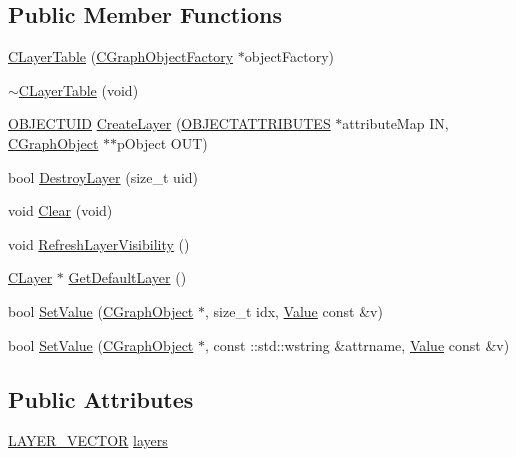 \subsection*{Public Member Functions}
\begin{DoxyCompactItemize}
\item 
\hyperlink{class_n_m_1_1_o_d_b_1_1_c_layer_table_a3bd3aa3cfc0edd9188c6542484140a89}{C\+Layer\+Table} (\hyperlink{class_n_m_1_1_o_d_b_1_1_c_graph_object_factory}{C\+Graph\+Object\+Factory} $\ast$object\+Factory)
\item 
\hyperlink{class_n_m_1_1_o_d_b_1_1_c_layer_table_aee72d52f48bdc5d4ddc794c76c1860e0}{$\sim$\+C\+Layer\+Table} (void)
\item 
\hyperlink{namespace_n_m_1_1_o_d_b_a262b64fab56baaa96e18bac4ada88265}{O\+B\+J\+E\+C\+T\+U\+I\+D} \hyperlink{class_n_m_1_1_o_d_b_1_1_c_layer_table_a11754d097db8435c8e9320be09a2d067}{Create\+Layer} (\hyperlink{namespace_n_m_1_1_o_d_b_a8770283da9792324e1afe8104d40123b}{O\+B\+J\+E\+C\+T\+A\+T\+T\+R\+I\+B\+U\+T\+E\+S} $\ast$attribute\+Map I\+N, \hyperlink{class_n_m_1_1_o_d_b_1_1_c_graph_object}{C\+Graph\+Object} $\ast$$\ast$p\+Object O\+U\+T)
\item 
bool \hyperlink{class_n_m_1_1_o_d_b_1_1_c_layer_table_a1e39594b2ca8dae39543eb995f28a0c0}{Destroy\+Layer} (size\+\_\+t uid)
\item 
void \hyperlink{class_n_m_1_1_o_d_b_1_1_c_layer_table_aea55a9942f623ba6536f8c2bc6b976a8}{Clear} (void)
\item 
void \hyperlink{class_n_m_1_1_o_d_b_1_1_c_layer_table_aea0edc60fd8ad0e455c276c900a0b93c}{Refresh\+Layer\+Visibility} ()
\item 
\hyperlink{class_n_m_1_1_o_d_b_1_1_c_layer}{C\+Layer} $\ast$ \hyperlink{class_n_m_1_1_o_d_b_1_1_c_layer_table_ab733b17744ea9d457852662aabf7ed58}{Get\+Default\+Layer} ()
\item 
bool \hyperlink{class_n_m_1_1_o_d_b_1_1_c_layer_table_a71a6bb2dbac48f3dd636c25d7d1b31f0}{Set\+Value} (\hyperlink{class_n_m_1_1_o_d_b_1_1_c_graph_object}{C\+Graph\+Object} $\ast$, size\+\_\+t idx, \hyperlink{class_n_m_1_1_o_d_b_1_1_value}{Value} const \&v)
\item 
bool \hyperlink{class_n_m_1_1_o_d_b_1_1_c_layer_table_a589923308ca7e92665b9999572d36bbd}{Set\+Value} (\hyperlink{class_n_m_1_1_o_d_b_1_1_c_graph_object}{C\+Graph\+Object} $\ast$, const \+::std\+::wstring \&attrname, \hyperlink{class_n_m_1_1_o_d_b_1_1_value}{Value} const \&v)
\end{DoxyCompactItemize}
\subsection*{Public Attributes}
\begin{DoxyCompactItemize}
\item 
\hyperlink{class_n_m_1_1_o_d_b_1_1_c_layer_table_ab1a405cd3c4cc2536d1af07fe96ddd92}{L\+A\+Y\+E\+R\+\_\+\+V\+E\+C\+T\+O\+R} \hyperlink{class_n_m_1_1_o_d_b_1_1_c_layer_table_a24f25cc4cd1e097b5c66f25369654fed}{layers}
\end{DoxyCompactItemize}
